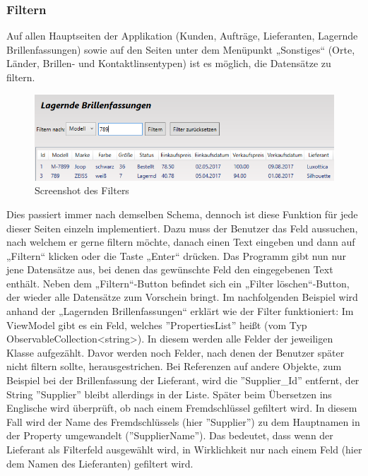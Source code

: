 \subsubsection{Filtern}
Auf allen Hauptseiten der Applikation (Kunden, Aufträge, Lieferanten, Lagernde Brillenfassungen) sowie auf den Seiten unter dem Menüpunkt „Sonstiges“ (Orte, Länder, Brillen- und Kontaktlinsentypen) ist es möglich, die Datensätze zu filtern. 
\begin{figure}[H]
\begin{center}
	\includegraphics[scale=0.75]{images/filter.png}
\end{center}
	\caption{Screenshot des Filters}
	\label{fig:sample}
\end{figure}
\noindent Dies passiert immer nach demselben Schema, dennoch ist diese Funktion für jede dieser Seiten einzeln implementiert. \newline
Dazu muss der Benutzer das Feld aussuchen, nach welchem er gerne filtern möchte, danach einen Text eingeben und dann auf „Filtern“ klicken oder die Tas\-te „Enter“ drücken. Das Programm gibt nun nur jene Datensätze aus, bei denen das gewünschte Feld den eingegebenen Text enthält. Neben dem „Filtern“-Button befindet sich ein „Filter löschen“-Button, der wieder alle Datensätze zum Vorschein bringt.
\noindent \newline Im nachfolgenden Beispiel wird anhand der „Lagernden Brillenfassungen“ erklärt wie der Filter funktioniert: \newline
Im ViewModel gibt es ein Feld, welches ''PropertiesList'' heißt (vom Typ ObservableCollection\textless string\textgreater). In diesem werden alle Felder der jeweiligen Klasse aufgezählt. Davor werden noch Felder, nach denen der Benutzer später nicht filtern sollte, herausgestrichen. Bei Referenzen auf andere Objekte, zum Beispiel bei der Brillenfassung der Lieferant, wird die ''Supplier\_Id'' entfernt, der String ''Supplier'' bleibt allerdings in der Liste. Später beim Übersetzen ins Englische wird überprüft, ob nach einem Fremdschlüssel gefiltert wird. In diesem Fall wird der Name des Fremdschlüssels (hier ''Supplier'') zu dem Hauptnamen in der Property umgewandelt (''SupplierName''). Das bedeutet, dass wenn der Lieferant als Filterfeld ausgewählt wird, in Wirklichkeit nur nach einem Feld (hier dem Namen des Lieferanten) gefiltert wird.
